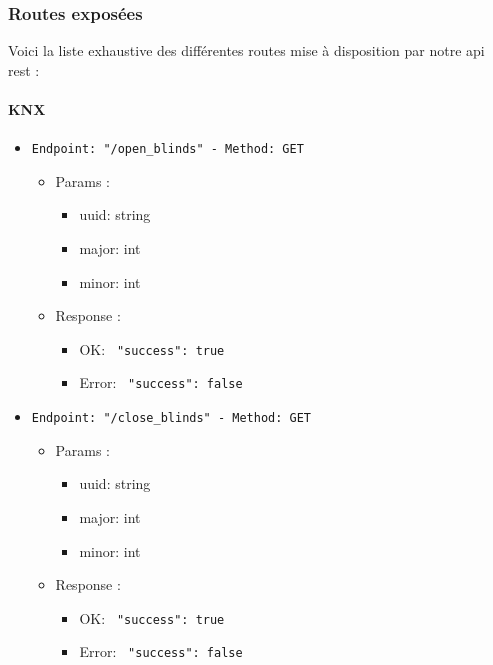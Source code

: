\subsubsection{Routes exposées}
Voici la liste exhaustive des différentes routes mise à disposition par notre \acrshort{api} \acrshort{rest} : 

\paragraph{KNX}

\begin{itemize}
  \item \texttt{Endpoint: "/open_blinds" -  Method: GET}
  \begin{itemize} 
    \item Params :
    \begin{itemize}
      \item uuid: string
      \item major: int
      \item minor: int
    \end{itemize}

    \item Response : 
    \begin{itemize}
      \item OK: \texttt{{ "success": true }}
      \item Error: \texttt{{ "success": false }}
    \end{itemize}
  \end{itemize}
\end{itemize}


\begin{itemize}
  \item \texttt{Endpoint: "/close_blinds" -  Method: GET}
  \begin{itemize} 
    \item Params :
    \begin{itemize}
      \item uuid: string
      \item major: int
      \item minor: int
    \end{itemize}

    \item Response : 
    \begin{itemize}
      \item OK: \texttt{{ "success": true }}
      \item Error: \texttt{{ "success": false }}
    \end{itemize}
  \end{itemize}
\end{itemize}

